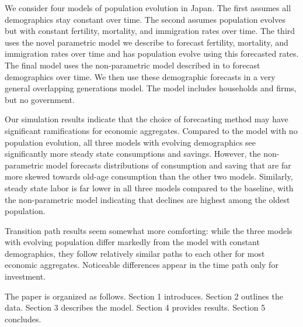 \documentclass[10pt]{article}
\renewcommand{\thesection}{\arabic{section}}
\renewcommand{\section}[2][]{\oldsection[#1]{#2}\index{#1}\label{sec:\thesection}}
\numberwithin{equation}{subsection}
\begin{document}
\par We consider four models of population evolution in Japan. The first assumes all demographics stay constant over time. The second assumes population evolves but with constant fertility, mortality, and immigration rates over time. The third uses the novel parametric model we describe to forecast fertility, mortality, and immigration rates over time and has population evolve using this forecasted rates. The final model uses the non-parametric model described in \cite{alt_demo_paper} to forecast demographics over time. We then use these demographic forecasts in a very general overlapping generations model. The model includes households and firms, but no government.

\par Our simulation results indicate that the choice of forecasting method may have significant ramifications for economic aggregates. Compared to the model with no population evolution, all three models with evolving demographics see significantly more steady state consumptions and savings. However, the non-parametric model forecasts distributions of consumption and saving that are far more skewed towards old-age consumption than the other two models. Similarly, steady state labor is far lower in all three models compared to the baseline, with the non-parametric model indicating that declines are highest among the oldest population.

\par Transition path results seem somewhat more comforting: while the three models with evolving population differ markedly from the model with constant demographics, they follow relatively similar paths to each other for most economic aggregates. Noticeable differences appear in the time path only for investment.

\par The paper is organized as follows. Section 1 introduces. Section 2 outlines the data. Section 3 describes the model. Section 4 provides results. Section 5 concludes.


\section{Data}
\end{document}
